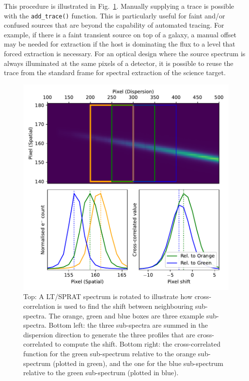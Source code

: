 \documentclass[twocolumn, linenumbers]{aastex631}
\begin{document}
This procedure is illustrated in Fig.~\ref{fig:trace}. Manually
supplying a trace is possible with the \texttt{add\_trace()}
function. This is particularly useful for faint and/or confused
sources that are beyond the capability of automated tracing. For
example, if there is a faint transient source on top of a galaxy,
a manual offset may be needed for extraction if the host is
dominating the flux to a level that forced extraction is necessary.
For an optical design where the source spectrum is always illuminated
at the same pixels of a detector, it is possible to reuse the trace
from the standard frame for spectral extraction of the science target.

\begin{figure}
    \centering
    \includegraphics[width=\columnwidth]{fig_01_tracing.pdf}
    \caption{Top: A LT/SPRAT spectrum is rotated to illustrate how
    cross-correlation is used to find the shift between neighbouring
    sub-spectra. The orange, green and blue boxes are three example
    sub-spectra. Bottom left: the three sub-spectra are summed in
    the dispersion direction to generate the three profiles that are
    cross-correlated to compute the shift. Bottom right: the
    cross-correlated function for the green sub-spectrum relative
    to the orange sub-spectrum (plotted in green), and the one
    for the blue sub-spectrum relative to the green sub-spectrum
    (plotted in blue).}
    \label{fig:trace}
\end{figure}
\end{document}
